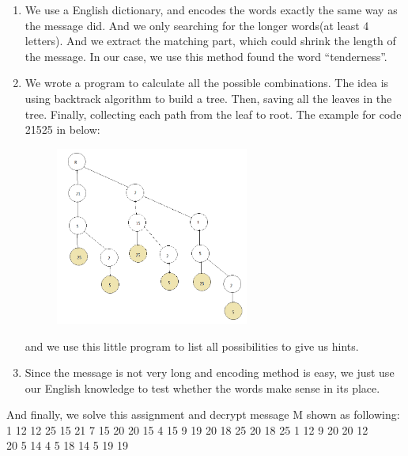 \documentclass[12pt]{article} %
\begin{document}
	\renewcommand\labelenumi{\arabic{enumi}.}
	\begin{enumerate}
		\item We use a English dictionary, and encodes the words exactly the same way as the message did. And we only searching for the longer words(at least 4 letters). And we extract the matching part, which could shrink the length of the message. In our case, we use this method found the word ``tenderness''.
		
		\item We wrote a program to calculate all the possible combinations. The idea is using backtrack algorithm to build a tree. Then, saving all the leaves in the tree. Finally, collecting each path from the leaf to root. The example for code 21525 in below: 
		
		\begin{figure}[h]
			\centering
			\includegraphics[width=0.6\textwidth]{tree.png}
		\end{figure}
		
		\pagebreak
		
		
		and we use this little program to list all possibilities to give us hints.
		
		\item Since the message is not very long and encoding method is easy, we just use our English knowledge to test whether the words make sense in its place.
		
	\end{enumerate}
	
	And finally, we solve this assignment and decrypt message M shown as following:\\
	
	
	1 12 12 25 15 21 7 15 20 20 15 4 15 9 19 20 18 25 20 18 25 1 12 9 20 20 12 \\
	 20 5 14 4 5 18 14 5 19 19\\
	
\end{document}
